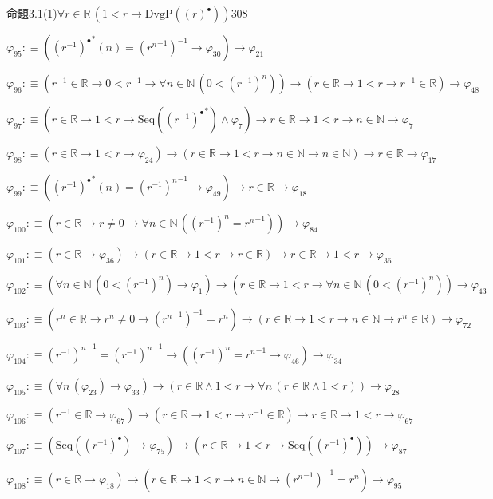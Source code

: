 \begin{fullproof}{命題3.1(1)}{$\forall r \in \mathbb{R}\,(1 < r \to \mathrm{DvgP}({(r)^{\bullet}}))$}{308}
\begin{abbrevlist}
\item $\varphi_{95} :\equiv ({(r^{-1})^{\bullet}}^{\ast}(n) = ({{r}^{n}}^{-1})^{-1} \to \varphi_{30}) \to \varphi_{21}$
\item $\varphi_{96} :\equiv (r^{-1} \in \mathbb{R} \to 0 < r^{-1} \to \forall n \in \mathbb{N}\,(0 < {{(r^{-1})}^{n}})) \to (r \in \mathbb{R} \to 1 < r \to r^{-1} \in \mathbb{R}) \to \varphi_{48}$
\item $\varphi_{97} :\equiv (r \in \mathbb{R} \to 1 < r \to \mathrm{Seq}({(r^{-1})^{\bullet}}^{\ast}) \land \varphi_{7}) \to r \in \mathbb{R} \to 1 < r \to n \in \mathbb{N} \to \varphi_{7}$
\item $\varphi_{98} :\equiv (r \in \mathbb{R} \to 1 < r \to \varphi_{24}) \to (r \in \mathbb{R} \to 1 < r \to n \in \mathbb{N} \to n \in \mathbb{N}) \to r \in \mathbb{R} \to \varphi_{17}$
\item $\varphi_{99} :\equiv ({(r^{-1})^{\bullet}}^{\ast}(n) = {{(r^{-1})}^{n}}^{-1} \to \varphi_{49}) \to r \in \mathbb{R} \to \varphi_{18}$
\item $\varphi_{100} :\equiv (r \in \mathbb{R} \to r \neq 0 \to \forall n \in \mathbb{N}\,({{(r^{-1})}^{n}} = {{r}^{n}}^{-1})) \to \varphi_{84}$
\item $\varphi_{101} :\equiv (r \in \mathbb{R} \to \varphi_{36}) \to (r \in \mathbb{R} \to 1 < r \to r \in \mathbb{R}) \to r \in \mathbb{R} \to 1 < r \to \varphi_{36}$
\item $\varphi_{102} :\equiv (\forall n \in \mathbb{N}\,(0 < {{(r^{-1})}^{n}}) \to \varphi_{1}) \to (r \in \mathbb{R} \to 1 < r \to \forall n \in \mathbb{N}\,(0 < {{(r^{-1})}^{n}})) \to \varphi_{43}$
\item $\varphi_{103} :\equiv ({{r}^{n}} \in \mathbb{R} \to {{r}^{n}} \neq 0 \to ({{r}^{n}}^{-1})^{-1} = {{r}^{n}}) \to (r \in \mathbb{R} \to 1 < r \to n \in \mathbb{N} \to {{r}^{n}} \in \mathbb{R}) \to \varphi_{72}$
\item $\varphi_{104} :\equiv {{(r^{-1})}^{n}}^{-1} = {{(r^{-1})}^{n}}^{-1} \to ({{(r^{-1})}^{n}} = {{r}^{n}}^{-1} \to \varphi_{46}) \to \varphi_{34}$
\item $\varphi_{105} :\equiv (\forall n\,(\varphi_{23}) \to \varphi_{33}) \to (r \in \mathbb{R} \land 1 < r \to \forall n\,(r \in \mathbb{R} \land 1 < r)) \to \varphi_{28}$
\item $\varphi_{106} :\equiv (r^{-1} \in \mathbb{R} \to \varphi_{67}) \to (r \in \mathbb{R} \to 1 < r \to r^{-1} \in \mathbb{R}) \to r \in \mathbb{R} \to 1 < r \to \varphi_{67}$
\item $\varphi_{107} :\equiv (\mathrm{Seq}({(r^{-1})^{\bullet}}) \to \varphi_{75}) \to (r \in \mathbb{R} \to 1 < r \to \mathrm{Seq}({(r^{-1})^{\bullet}})) \to \varphi_{87}$
\item $\varphi_{108} :\equiv (r \in \mathbb{R} \to \varphi_{18}) \to (r \in \mathbb{R} \to 1 < r \to n \in \mathbb{N} \to ({{r}^{n}}^{-1})^{-1} = {{r}^{n}}) \to \varphi_{95}$
\end{abbrevlist}
\end{fullproof}
